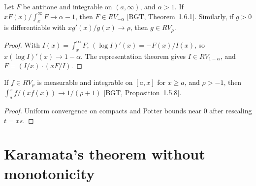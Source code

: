 \begin{theorem}
  \label{thm:karamata-converse}
  \leanok
  Let $F$ be antitone and integrable on $(a, \infty)$, and $\alpha > 1$. If
  $x F(x) / \int_x^\infty F \to \alpha - 1$, then $F \in RV_{-\alpha}$ [BGT, Theorem~1.6.1].
  Similarly, if $g > 0$ is differentiable with $x g'(x)/g(x) \to \rho$, then $g \in RV_\rho$.
\end{theorem}
\begin{proof}
  \leanok
  With $I(x) = \int_x^\infty F$, $(\log I)'(x) = -F(x)/I(x)$, so $x (\log I)'(x) \to 1 - \alpha$.
  The representation theorem gives $I \in RV_{1-\alpha}$, and $F = (I/x) \cdot (x F/I)$.
\end{proof}

\begin{theorem}
  \label{thm:karamata-zero}
  \leanok
  If $f \in RV_\rho$ is measurable and integrable on $[a, x]$ for $x \ge a$, and $\rho > -1$, then
  $\int_a^x f / (x f(x)) \to 1/(\rho + 1)$ [BGT, Proposition~1.5.8].
\end{theorem}
\begin{proof}
  \leanok
  Uniform convergence on compacts and Potter bounds near $0$ after rescaling $t = x s$.
\end{proof}

\section{Karamata's theorem without monotonicity}

